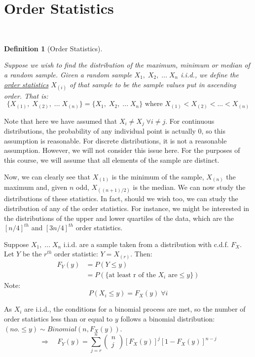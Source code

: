 \documentclass[12pt,a4paper]{article}
\newtheorem{defn}[thm]{Definition}
\begin{document}
\clearpage
\section{Order Statistics}\label{order stats}$\;$

\begin{defn}[Order Statistics]$\;$\par\vspace{1cm}

Suppose we wish to find the distribution of the maximum, minimum or median of a random sample. Given a random sample $X_1,\; X_2,\; ...\; X_n$ i.i.d., we define the \underline{order statistics} $X_{(i)}$ of that sample to be the sample values put in ascending order. That is:
$$\{X_{(1)},\; X_{(2)},\; ...\; X_{(n)}\} = \{X_1,\; X_2,\; ...\; X_n\} \text{ where } X_{(1)}<X_{(2)}< ... < X_{(n)}$$
\end{defn}

Note that here we have assumed that $X_i \neq X_j \; \forall i \neq j$. For continuous distributions, the probability of any individual point is actually 0, so this assumption is reasonable. For discrete distributions, it is not a reasonable assumption. However, we will not consider this issue here. For the purposes of this course, we will assume that all elements of the sample are distinct.

Now, we can clearly see that $X_{(1)}$ is the minimum of the sample, $X_{(n)}$ the maximum and, given $n$ odd, $X_{((n+1)/2)}$ is the median. We can now study the distributions of these statistics. In fact, should we wish too, we can study the distribution of any of the order statistics. For instance, we might be interested in the distributions of the upper and lower quartiles of the data, which are the $[n/4]^{th}$ and $[3n/4]^{th}$ order statistics.

Suppose $X_1,\; ...\; X_n$ i.i.d. are a sample taken from a distribution with c.d.f. $F_X$. Let $Y$ be the $r^{th}$ order statistic: $Y=X_{(r)}$. Then:
\begin{align*}
F_Y(y) &= P(Y\leq y)\\
&= P(\{\text{at least r of the $X_i$ are} \leq y\})
\end{align*}
Note:
$$P(X_i \leq y) = F_X(y)\; \forall i$$

As $X_i$ are i.i.d., the conditions for a binomial process are met, so the number of order statistics less than or equal to $y$ follows a binomial distribution: $(no. \leq y) \sim Binomial(n, F_X(y))$.
$$\Rightarrow \quad F_Y(y) = \sum_{j=r}^n \left(\!\!\!\begin{array}{c} n\\j\end{array}\!\!\!\right) [F_X(y)]^j [1-F_X(y)]^{n-j}$$
\end{document}
